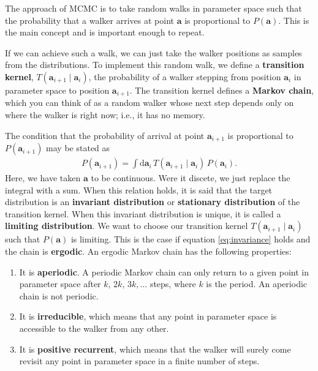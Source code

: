 The approach of MCMC is to take random walks in parameter space such
that the probability that a walker arrives at point $\mathbf{a}$ is
proportional to $P(\mathbf{a})$.  This is the main concept and is
important enough to repeat.


If we can achieve such a walk, we can just take the walker positions
as samples from the distributions.  To implement this random walk, we
define a \textbf{transition kernel},
$T(\mathbf{a}_{i+1}\mid \mathbf{a}_i)$, the probability of a walker
stepping from position $\mathbf{a}_i$ in parameter space to position
$\mathbf{a}_{i+1}$.  The transition kernel defines a \textbf{Markov
  chain}, which you can think of as a random walker whose next step
depends only on where the walker is right now; i.e., it has no memory.

The condition that the probability of arrival at
point $\mathbf{a}_{i+1}$ is proportional to $P(\mathbf{a}_{i+1})$ may
be stated as
\begin{align}
P(\mathbf{a}_{i+1}) = \int \mathrm{d}\mathbf{a}_i\, T(\mathbf{a}_{i+1}\mid \mathbf{a}_i)\,
P(\mathbf{a}_i).
\label{eq:invariance}
\end{align}
Here, we have taken $\mathbf{a}$ to be continuous. Were it discete, we just replace the integral with a sum.
When this relation holds, it is said that the target distribution is
an \textbf{invariant distribution} or \textbf{stationary distribution}
of the transition kernel.  When this invariant distribution is unique,
it is called a \textbf{limiting distribution}.  We want to choose our
transition kernel $T(\mathbf{a}_{i+1}\mid \mathbf{a}_i)$ such that
$P(\mathbf{a})$ is limiting.  This is the case if equation
\eqref{eq:invariance} holds and the chain is \textbf{ergodic}.  An
ergodic Markov chain has the following properties:
\begin{enumerate}
\item It is \textbf{aperiodic}.  A periodic Markov chain can only
  return to a given point in parameter space after $k$, $2k$,
  $3k,\ldots$ steps, where $k$ is the period.  An aperiodic chain is
  not periodic.
\item It is \textbf{irreducible}, which means that any point in
  parameter space is accessible to the walker from any other.
\item It is \textbf{positive recurrent}, which means that the walker
  will surely come revisit any point in parameter space in a finite
  number of steps.
\end{enumerate}

